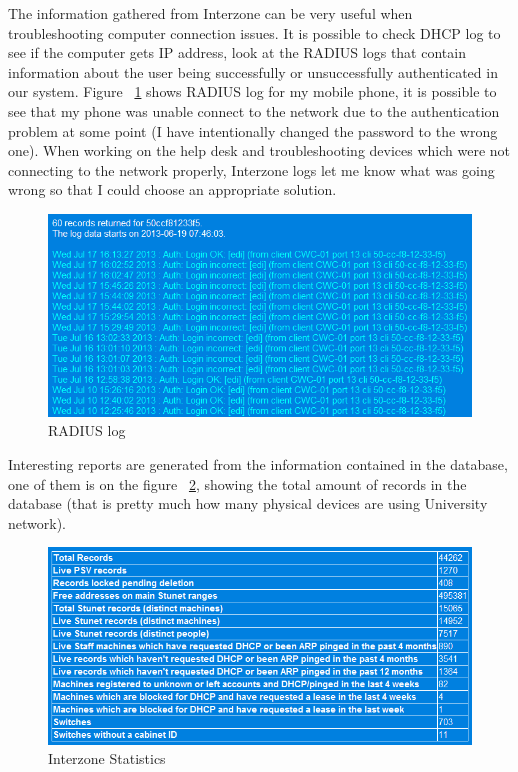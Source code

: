 \documentclass[10pt,a4paper,headinclude=true]{report}
\begin{document}
The information gathered from Interzone can be very useful when troubleshooting computer connection issues. It is possible to check DHCP log to see if the computer gets IP address, look at the RADIUS logs that contain information about the user being successfully or unsuccessfully authenticated in our system. Figure ~\ref{fig:interzone_radius} shows RADIUS log for my mobile phone, it is possible to see that my phone was unable connect to the network due to the authentication problem at some point (I have intentionally changed the password to the wrong one). When working on the help desk and troubleshooting devices which were not connecting to the network properly, Interzone logs let me know what was going wrong so that I could choose an appropriate solution. 

\begin{figure}[H]
\centering
\centerline{\includegraphics[scale=0.5]{./interzone_radius}}
\caption{RADIUS log}
\label{fig:interzone_radius}
\end{figure}

Interesting reports are generated from the information contained in the database, one of them is on the figure ~\ref{fig:interzone_statistics}, showing the total amount of records in the database (that is pretty much how many physical devices are using University network).

\begin{figure}[H]
\centering
\centerline{\includegraphics[scale=0.5]{./interzone_statistics}}
\caption{Interzone Statistics}
\label{fig:interzone_statistics}
\end{figure}
\end{document}
